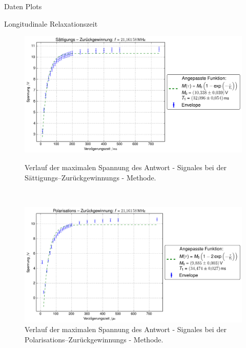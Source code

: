 \begin{appendix}
\begin{chapter}{Daten Plots}
    \newpage
    \begin{section}{Longitudinale Relaxationszeit}
      \label{chpAnhangLong}
      \begin{figure}[htb!]
        \centering
        \begin{minipage}{\textwidth}
          \centering
          \includegraphics[width=\textwidth]
          {Figures/SaettigungsZurueckgewinnung.png}
          \caption{Verlauf der maximalen Spannung des Antwort - Signales bei
            der Sättigungs--Zurückgewinnungs - Methode.}
          \label{AnhangfigSaettigung}
        \end{minipage}\\
        \begin{minipage}{\textwidth}
          \centering
          \includegraphics[width=\textwidth]
          {Figures/PolarisationsZurueckgewinnung.png}
          \caption{Verlauf der maximalen Spannung des Antwort - Signales bei
            der Polarisations--Zurückgewinnungs - Methode.}
          \label{AnhangfigPolarisation}
        \end{minipage}
      \end{figure}
      

\end{section}
\end{chapter}
\end{appendix}
